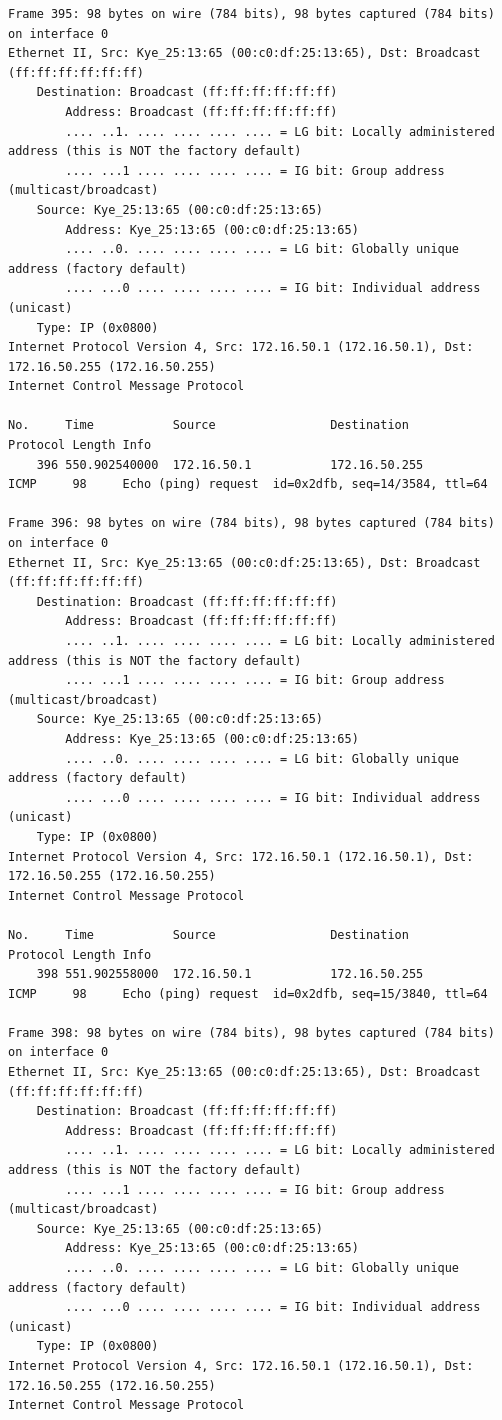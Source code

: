 \documentclass[a4paper,11pt]{article}
\begin{document}
\begin{lstlisting}
Frame 395: 98 bytes on wire (784 bits), 98 bytes captured (784 bits) on interface 0
Ethernet II, Src: Kye_25:13:65 (00:c0:df:25:13:65), Dst: Broadcast (ff:ff:ff:ff:ff:ff)
    Destination: Broadcast (ff:ff:ff:ff:ff:ff)
        Address: Broadcast (ff:ff:ff:ff:ff:ff)
        .... ..1. .... .... .... .... = LG bit: Locally administered address (this is NOT the factory default)
        .... ...1 .... .... .... .... = IG bit: Group address (multicast/broadcast)
    Source: Kye_25:13:65 (00:c0:df:25:13:65)
        Address: Kye_25:13:65 (00:c0:df:25:13:65)
        .... ..0. .... .... .... .... = LG bit: Globally unique address (factory default)
        .... ...0 .... .... .... .... = IG bit: Individual address (unicast)
    Type: IP (0x0800)
Internet Protocol Version 4, Src: 172.16.50.1 (172.16.50.1), Dst: 172.16.50.255 (172.16.50.255)
Internet Control Message Protocol

No.     Time           Source                Destination           Protocol Length Info
    396 550.902540000  172.16.50.1           172.16.50.255         ICMP     98     Echo (ping) request  id=0x2dfb, seq=14/3584, ttl=64

Frame 396: 98 bytes on wire (784 bits), 98 bytes captured (784 bits) on interface 0
Ethernet II, Src: Kye_25:13:65 (00:c0:df:25:13:65), Dst: Broadcast (ff:ff:ff:ff:ff:ff)
    Destination: Broadcast (ff:ff:ff:ff:ff:ff)
        Address: Broadcast (ff:ff:ff:ff:ff:ff)
        .... ..1. .... .... .... .... = LG bit: Locally administered address (this is NOT the factory default)
        .... ...1 .... .... .... .... = IG bit: Group address (multicast/broadcast)
    Source: Kye_25:13:65 (00:c0:df:25:13:65)
        Address: Kye_25:13:65 (00:c0:df:25:13:65)
        .... ..0. .... .... .... .... = LG bit: Globally unique address (factory default)
        .... ...0 .... .... .... .... = IG bit: Individual address (unicast)
    Type: IP (0x0800)
Internet Protocol Version 4, Src: 172.16.50.1 (172.16.50.1), Dst: 172.16.50.255 (172.16.50.255)
Internet Control Message Protocol

No.     Time           Source                Destination           Protocol Length Info
    398 551.902558000  172.16.50.1           172.16.50.255         ICMP     98     Echo (ping) request  id=0x2dfb, seq=15/3840, ttl=64

Frame 398: 98 bytes on wire (784 bits), 98 bytes captured (784 bits) on interface 0
Ethernet II, Src: Kye_25:13:65 (00:c0:df:25:13:65), Dst: Broadcast (ff:ff:ff:ff:ff:ff)
    Destination: Broadcast (ff:ff:ff:ff:ff:ff)
        Address: Broadcast (ff:ff:ff:ff:ff:ff)
        .... ..1. .... .... .... .... = LG bit: Locally administered address (this is NOT the factory default)
        .... ...1 .... .... .... .... = IG bit: Group address (multicast/broadcast)
    Source: Kye_25:13:65 (00:c0:df:25:13:65)
        Address: Kye_25:13:65 (00:c0:df:25:13:65)
        .... ..0. .... .... .... .... = LG bit: Globally unique address (factory default)
        .... ...0 .... .... .... .... = IG bit: Individual address (unicast)
    Type: IP (0x0800)
Internet Protocol Version 4, Src: 172.16.50.1 (172.16.50.1), Dst: 172.16.50.255 (172.16.50.255)
Internet Control Message Protocol


\end{lstlisting}
\end{document}
